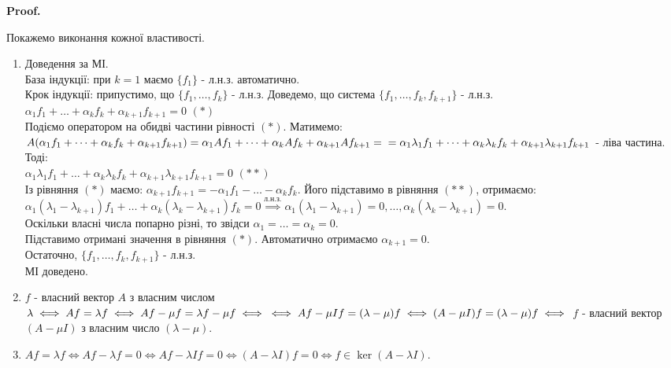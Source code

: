 \documentclass[a4paper, 10pt]{article}
\makeatletter
\theoremstyle{theoremdd}
\renewenvironment{proof}[1][Proof.\\]{\par
\pushQED{\hfill \qed}%
\normalfont \topsep6\p@\@plus6\p@\relax
\trivlist
\item\relax
{\bfseries
#1\@addpunct{.}}\hspace\labelsep\ignorespaces
}{%
\popQED\endtrivlist\@endpefalse
}
\makeatother
\begin{document}
\begin{proof}
Покажемо виконання кожної властивості.
\begin{enumerate}[wide=0pt, label={\arabic*)},topsep=-\parskip]
\item Доведення за МІ.\\
База індукції: при $k=1$ маємо $\{f_1\}$ - л.н.з. автоматично.\\
Крок індукції: припустимо, що $\{f_1,\dots,f_k\}$ - л.н.з. Доведемо, що система $\{f_1,\dots,f_k, f_{k+1}\}$ - л.н.з.\\
$\alpha_1 f_1 + \dots + \alpha_k f_k + \alpha_{k+1} f_{k+1} = 0$ $(*)$\\
Подіємо оператором на обидві частини рівності $(*)$. Матимемо:\\
$A(\alpha_1 f_1 + \dots + \alpha_k f_k + \alpha_{k+1} f_{k+1}) = \alpha_1 Af_1 + \dots + \alpha_k Af_k + \alpha_{k+1} Af_{k+1} = \\ = \alpha_1 \lambda_1 f_1 + \dots + \alpha_k \lambda_k f_k + \alpha_{k+1} \lambda_{k+1} f_{k+1}$ - ліва частина. Тоді:\\
$\alpha_1 \lambda_1 f_1 + \dots + \alpha_k \lambda_k f_k + \alpha_{k+1} \lambda_{k+1} f_{k+1} = 0$ $(**)$\\
Із рівняння $(*)$ маємо: $\alpha_{k+1}f_{k+1} = -\alpha_1 f_1 - \dots - \alpha_k f_k$. Його підставимо в рівняння $(**)$, отримаємо:\\
$\alpha_1 (\lambda_1 - \lambda_{k+1})f_1 + \dots + \alpha_k (\lambda_k - \lambda_{k+1})f_k = 0 \overset{\textrm{л.н.з.}}{\implies} \alpha_1(\lambda_1 - \lambda_{k+1})=0, \dots, \alpha_k(\lambda_k - \lambda_{k+1}) = 0$.\\
Оскільки власні числа попарно різні, то звідси $\alpha_1 = \dots = \alpha_k = 0$.\\
Підставимо отримані значення в рівняння $(*)$. Автоматично отримаємо $\alpha_{k+1} = 0$.\\
Остаточно, $\{f_1,\dots,f_k, f_{k+1}\}$ - л.н.з.\\
МІ доведено.

\item $f$ - власний вектор $A$ з власним числом $\lambda \iff Af = \lambda f \iff Af - \mu f = \lambda f - \mu f \iff \\ \iff Af - \mu If = (\lambda - \mu)f \iff (A-\mu I)f = (\lambda - \mu)f \iff$ $f$ - власний вектор $(A- \mu I)$ з власним число $(\lambda - \mu)$.

\item $Af = \lambda f \iff Af - \lambda f = 0 \iff Af - \lambda If = 0 \iff (A-\lambda I)f = 0 \iff f \in \ker(A - \lambda I)$.


\end{enumerate}
\end{proof}
\end{document}

